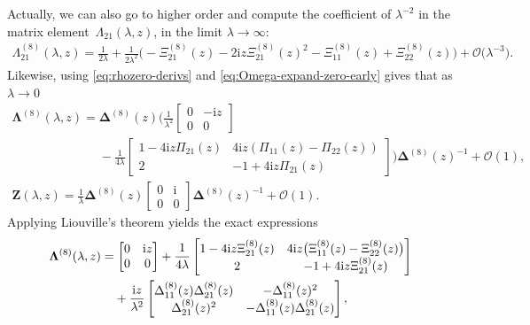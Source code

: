 \documentclass[11pt]{article}
\numberwithin{equation}{section}
\numberwithin{equation}{section}
\newcommand{\ii}{\mathrm{i}}
\begin{document}
Actually, we can also go to higher order and compute the coefficient of $\lambda^{-2}$ in the matrix element~$\Lambda_{21}(\lambda,z)$,
in the limit $\lambda\to\infty$:
\begin{align}
\Lambda_{21}^{(8)}(\lambda,z)=\frac{1}{2\lambda} +\frac{1}{2\lambda^2}\bigl(-\Xi_{21}^{(8)}(z)-{2\ii z}{}\Xi_{21}^{(8)}(z)^2-\Xi_{11}^{(8)}(z)+\Xi_{22}^{(8)}(z)\bigr)
+\mathcal{O}\big(\lambda^{-3}\big).
 \label{eq:Lambda21-higher-order}
\end{align}
Likewise, using \eqref{eq:rhozero-derivs} and \eqref{eq:Omega-expand-zero-early} gives that as $\lambda \to 0$
\begin{gather}
 \mathbf{\Lambda}^{(8)}(\lambda,z)=\mathbf{\Delta}^{(8)}(z)\Bigg(\frac{1}{\lambda^2}\begin{bmatrix}0&{-\ii z}{} \\0&0\end{bmatrix}\nonumber \\ \phantom{\mathbf{\Lambda}^{(8)}(\lambda,z)=}{}-\frac{1}{4\lambda}\begin{bmatrix}1-{4\ii z}\Pi_{21}(z)&{4\ii z}{}(\Pi_{11}(z)-\Pi_{22}(z))\\2&-1+{4\ii z}\Pi_{21}(z)\end{bmatrix}\Bigg)\mathbf{\Delta}^{(8)}(z)^{-1}
+ \mathcal{O}(1),\nonumber
 \\
 \mathbf{Z}(\lambda,z)=\frac{1}{\lambda}\mathbf{\Delta}^{(8)}(z)\begin{bmatrix}0&{\ii}{} \\0&0\end{bmatrix}\mathbf{\Delta}^{(8)}(z)^{-1} + \mathcal{O}(1).
\label{eq:Lax-coefficients-zero}
\end{gather}
Applying Liouville's theorem yields the exact expressions
\begin{align}
 & \mathbf{\Lambda}^{(8)}(\lambda,z)= \begin{bmatrix}0&{\ii z}{} \\0&0\end{bmatrix} +\frac{1}{4\lambda}\begin{bmatrix}1-{4\ii z}\Xi^{(8)}_{21}(z) & {4\ii z}{}\big(\Xi^{(8)}_{11}(z)-\Xi^{(8)}_{22}(z)\big) \\ 2 &-1 +{4\ii z}{}\Xi^{(8)}_{21}(z)\end{bmatrix}\nonumber
 \\
 &\hphantom{\mathbf{\Lambda}^{(8)}(\lambda,z)= }{}
 +\frac{\ii z}{\lambda^2}\begin{bmatrix}\Delta^{(8)}_{11}(z)\Delta^{(8)}_{21}(z) & -\Delta^{(8)}_{11}(z)^2 \\
 \Delta^{(8)}_{21}(z)^2 & -\Delta^{(8)}_{11}(z)\Delta^{(8)}_{21}(z)\end{bmatrix},
\label{eq:Lambda-exact}
\end{align}
\end{document}
